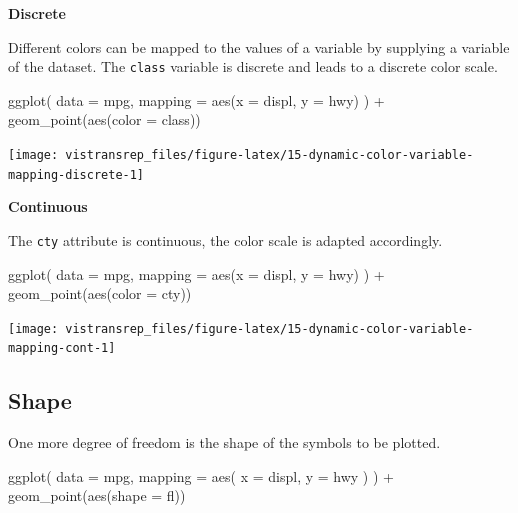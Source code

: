 \documentclass[]{book}
\newenvironment{Shaded}{}{}
\newcommand{\DataTypeTok}[1]{#1}
\newcommand{\KeywordTok}[1]{\textcolor[rgb]{0.00,0.00,1.00}{#1}}
\newcommand{\NormalTok}[1]{#1}
\newcommand{\OperatorTok}[1]{#1}
\newcommand{\StringTok}[1]{\textcolor[rgb]{0.00,0.50,0.50}{#1}}
\begin{document}
\textbf{Discrete}

Different colors can be mapped to the values of a variable by supplying a variable of the dataset.
The \texttt{class} variable is discrete and leads to a discrete color scale.

\begin{Shaded}
\begin{Highlighting}[]
\KeywordTok{ggplot}\NormalTok{(}
  \DataTypeTok{data =}\NormalTok{ mpg,}
  \DataTypeTok{mapping =} \KeywordTok{aes}\NormalTok{(}\DataTypeTok{x =}\NormalTok{ displ, }\DataTypeTok{y =}\NormalTok{ hwy)}
\NormalTok{) }\OperatorTok{+}
\StringTok{  }\KeywordTok{geom_point}\NormalTok{(}\KeywordTok{aes}\NormalTok{(}\DataTypeTok{color =}\NormalTok{ class))}
\end{Highlighting}
\end{Shaded}

\begin{flushright}\texttt{[image: vistransrep\_files/figure-latex/15-dynamic-color-variable-mapping-discrete-1]} \end{flushright}

\textbf{Continuous}

The \texttt{cty} attribute is continuous, the color scale is adapted accordingly.

\begin{Shaded}
\begin{Highlighting}[]
\KeywordTok{ggplot}\NormalTok{(}
  \DataTypeTok{data =}\NormalTok{ mpg,}
  \DataTypeTok{mapping =} \KeywordTok{aes}\NormalTok{(}\DataTypeTok{x =}\NormalTok{ displ, }\DataTypeTok{y =}\NormalTok{ hwy)}
\NormalTok{) }\OperatorTok{+}
\StringTok{  }\KeywordTok{geom_point}\NormalTok{(}\KeywordTok{aes}\NormalTok{(}\DataTypeTok{color =}\NormalTok{ cty))}
\end{Highlighting}
\end{Shaded}

\begin{flushright}\texttt{[image: vistransrep\_files/figure-latex/15-dynamic-color-variable-mapping-cont-1]} \end{flushright}

\hypertarget{shape}{%
\subsection{Shape}\label{shape}}

One more degree of freedom is the shape of the symbols to be plotted.

\begin{Shaded}
\begin{Highlighting}[]
\KeywordTok{ggplot}\NormalTok{(}
  \DataTypeTok{data =}\NormalTok{ mpg,}
  \DataTypeTok{mapping =} \KeywordTok{aes}\NormalTok{(}
    \DataTypeTok{x =}\NormalTok{ displ,}
    \DataTypeTok{y =}\NormalTok{ hwy}
\NormalTok{  )}
\NormalTok{) }\OperatorTok{+}
\StringTok{  }\KeywordTok{geom_point}\NormalTok{(}\KeywordTok{aes}\NormalTok{(}\DataTypeTok{shape =}\NormalTok{ fl))}
\end{Highlighting}
\end{Shaded}
\end{document}
